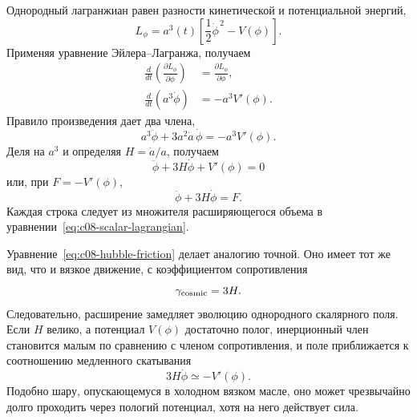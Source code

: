 Однородный лагранжиан равен разности кинетической и потенциальной энергий,
\begin{equation}
L_\phi=a^3(t)
\left[
\frac12\dot\phi^{\,2}-V(\phi)
\right].
\label{eq:c08-scalar-lagrangian}
\end{equation}
Применяя уравнение Эйлера--Лагранжа, получаем
\begin{align}
\frac{d}{dt}\left(\frac{\partial L_\phi}{\partial\dot\phi}\right)
&=
\frac{\partial L_\phi}{\partial\phi},\\
\frac{d}{dt}\left(a^3\dot\phi\right)
&=-a^3V'(\phi).
\end{align}
Правило произведения дает два члена,
\begin{equation}
a^3\ddot\phi+3a^2\dot a\,\dot\phi
=-a^3V'(\phi).
\end{equation}
Деля на \(a^3\) и определяя \(H=\dot a/a\), получаем
\begin{equation}
\boxed{
\ddot\phi+3H\dot\phi+V'(\phi)=0
}
\label{eq:c08-hubble-friction}
\end{equation}
или, при \(F=-V'(\phi)\),
\begin{equation}
\ddot\phi+3H\dot\phi=F.
\end{equation}
Каждая строка следует из множителя расширяющегося объема в уравнении~\eqref{eq:c08-scalar-lagrangian}.

\begin{classroomqa}
\end{classroomqa}

Уравнение~\eqref{eq:c08-hubble-friction} делает аналогию точной. Оно имеет тот же вид, что и вязкое движение, с коэффициентом сопротивления
\begin{equation}
\gamma_{\rm cosmic}=3H.
\end{equation}
Следовательно, расширение замедляет эволюцию однородного скалярного поля. Если \(H\) велико, а потенциал \(V(\phi)\) достаточно полог, инерционный член становится малым по сравнению с членом сопротивления, и поле приближается к соотношению медленного скатывания
\begin{equation}
3H\dot\phi\simeq-V'(\phi).
\end{equation}
Подобно шару, опускающемуся в холодном вязком масле, оно может чрезвычайно долго проходить через пологий потенциал, хотя на него действует сила.

